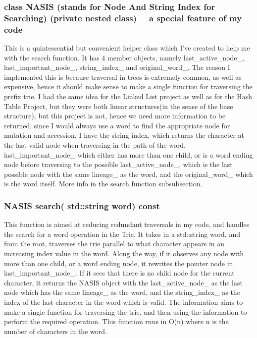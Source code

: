 \subsubsection{{\color{orange}class} {\color{draculapurple}NASIS} (stands for {\color{draculapurple}N}ode {\color{draculapurple}A}nd {\color{draculapurple}S}tring {\color{draculapurple}I}ndex for {\color{draculapurple}S}earching)  (private nested class)\newline
\faStar~~{\color{Awesome}a special feature of my code}~~\faStar}
This is a quintessential but convenient helper class which I've created to help me with the search function. 
It has 4 member objects, namely {\color{draculapurple}last\_active\_node\_}, {\color{draculapurple}last\_important\_node\_}, {\color{draculapurple}string\_index\_} and {\color{draculapurple}original\_word\_}.	
The reason I implemented this is because traversal in trees is extremely common, as well as expensive, hence it should make sense to make a single function for traversing the prefix trie, 
I had the same idea for the Linked List project as well as for the Hash Table Project, but they were both linear structures(in the sense of the base structure), but this project is not, 
hence we need more information to be returned, since I would always use a word to find the appropriate node for mutation and accession, I have the string index, which returns the 
character at the last valid node when traversing in the path of the word. {\color{draculapurple}last\_important\_node\_} which either has more than one child, 
or is a word ending node before traversing to the possible {\color{draculapurple}last\_active\_node\_}, which is the last possible node with the same 
{\color{draculapurple}lineage\_} as the word, and the {\color{draculapurple}original\_word\_} which is the word itself. 
More info in the search function subsubsection. 



\subsubsection{{\color{orange}NASIS} {\color{draculapurple}search}({\color{orange} std::string} word) {\color{GoldenYellow} const}}
This function is aimed at reducing redundant traversals in my code, and handles the search for a word operation in the Trie. 
It takes in a {\color{orange}std::string} word, and from the root, traverses the trie parallel to what character appears in an increasing index value in the word.
Along the way, if it observes any node with more than one child, or a word ending node, it rewrites the pointer node in {\color{draculapurple}last\_important\_node\_}. 
If it sees that there is no child node for the current character, it returns the {\color{draculapurple}NASIS} object with the {\color{draculapurple}last\_active\_node\_} 
as the last node which has the same {\color{draculapurple}lineage\_} as the word, and the {\color{draculapurple}string\_index\_} as the index of the last character 
in the word which is valid. The information aims to make a single function for traversing the trie, and then using the information to perform the required operation.
This function runs in {\color{lightblue}O(n)} where {\color{lightblue}n} is the number of characters in the word.


